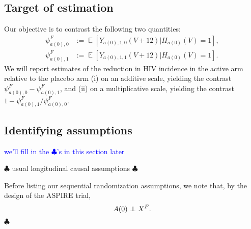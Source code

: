 \documentclass[12pt]{article}
\theoremstyle{definition}
\newcommand\independent{\protect\mathpalette{\protect\independenT}{\perp}}
\def\independenT#1#2{\mathrel{\rlap{$#1#2$}\mkern2mu{#1#2}}}
\DeclareMathOperator{\cE}{\mathbb{E}}
\newcommand{\Hopen}{V}
\begin{document}
\subsection{Target of estimation}
Our objective is to contrast the following two quantities:
\begin{align}
    \psi_{a(0),0}^F&:= \cE[Y_{a(0),1,0}(\Hopen+12)|H_{a(0)}(\Hopen)=1], \nonumber \\
    \psi_{a(0),1}^F&:= \cE[Y_{a(0),1,1}(\Hopen+12)|H_{a(0)}(\Hopen)=1]. \label{eq:margmean}
\end{align}
We will report estimates of the reduction in HIV incidence in the active arm relative to the placebo arm (i) on an additive scale, yielding the contrast $\psi_{a(0),0}^F - \psi_{a(0),1}^F$, and (ii) on a multiplicative scale, yielding the contrast $1-\psi_{a(0),1}^F/\psi_{a(0),0}^F$.

\subsection{Identifying assumptions}
\textcolor{blue}{we'll fill in the $\clubsuit$'s in this section later}

$\clubsuit$ usual longitudinal causal assumptions $\clubsuit$

Before listing our sequential randomization assumptions, we note that, by the design of the ASPIRE trial,
\begin{align}
    A(0)\independent X^F. \label{eq:A0rand}
\end{align}
$\clubsuit$
\end{document}
